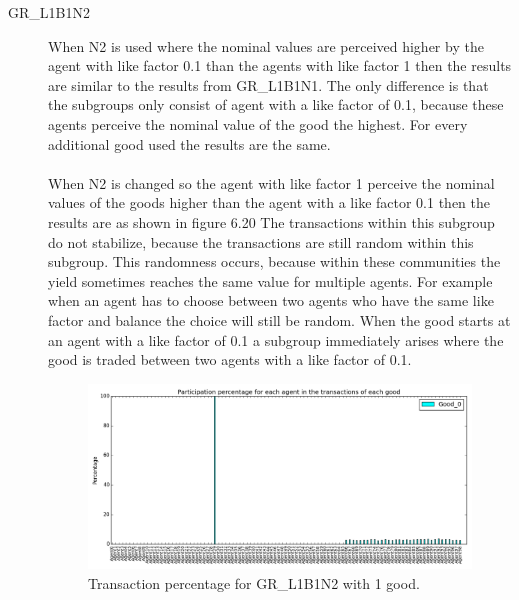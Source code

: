 \documentclass[twoside,openright]{uva-bachelor-thesis}
\begin{document}
\begin{description}
\clearpage
\item[GR\_L1B1N2] When N2 is used where the nominal values are perceived higher by the agent with like factor 0.1 than the agents with like factor 1 then the results are similar to the results from GR\_L1B1N1. The only difference is that the subgroups only consist of agent with a like factor of 0.1, because these agents perceive the nominal value of the good the highest. For every additional good used the results are the same.
\\
\\
When N2 is changed so the agent with like factor 1 perceive the nominal values of the goods higher than the agent with a like factor 0.1 then the results are as shown in figure 6.20 The transactions within this subgroup do not stabilize, because the transactions are still random within this subgroup. This randomness occurs, because within these communities the yield sometimes reaches the same value for multiple agents. For example when an agent has to choose between two agents who have the same like factor and balance the choice will still be random.
When the good starts at an agent with a like factor of 0.1 a subgroup immediately arises where the good is traded between two agents with a like factor of 0.1.\\
\begin{figure}[h!]
\centering
\includegraphics[scale=0.4]{Simulation_figures/GR_L1B1N2/321_1good} 
\caption{Transaction percentage for GR\_L1B1N2 with 1 good.}
\end{figure}



\end{description}
\end{document}
